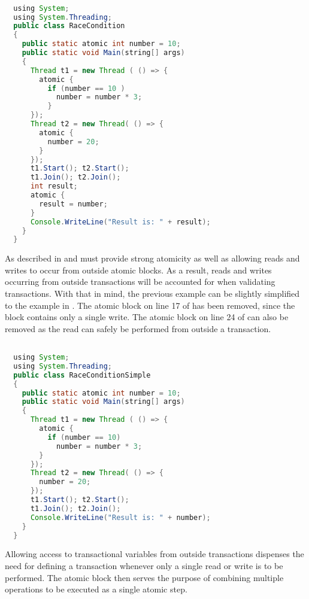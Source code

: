 \begin{lstlisting}[label=lst:stm_atomic_syntax,
 caption={Transaction Syntax},
 language=Java, 
 showspaces=false,
 showtabs=false,
 breaklines=true,
 showstringspaces=false,
 breakatwhitespace=true,
 commentstyle=\color{greencomments},
 keywordstyle=\color{bluekeywords},
 stringstyle=\color{redstrings},
 morekeywords={atomic, retry, orElse, var, get, set, using}]  % Start your code-block

  using System;
  using System.Threading;
  public class RaceCondition
  {
    public static atomic int number = 10;
    public static void Main(string[] args)
    {
      Thread t1 = new Thread ( () => {
        atomic {
          if (number == 10 )          
            number = number * 3;
          }
      });
      Thread t2 = new Thread( () => {
        atomic {
          number = 20;
        }
      });
      t1.Start(); t2.Start();
      t1.Join(); t2.Join();
      int result;
      atomic {
        result = number;         
      }
      Console.WriteLine("Result is: " + result);
    }
  }
\end{lstlisting}

As described in  and  \stmnamesp must provide strong atomicity as well as allowing reads and writes to occur from outside atomic blocks. As a result, reads and writes occurring from outside transactions will be accounted for when validating transactions. With that in mind, the previous example can be slightly simplified to the example in . The atomic block on line 17 of  has been removed, since the  block contains only a single write. The atomic block on line 24 of  can also be removed as the read can safely be performed from outside a transaction.

\begin{lstlisting}[label=lst:stm_atomic_syntax_simplified,
 caption={Transaction Syntax Simplified},
 language=Java, 
 showspaces=false,
 showtabs=false,
 breaklines=true,
 showstringspaces=false,
 breakatwhitespace=true,
 commentstyle=\color{greencomments},
 keywordstyle=\color{bluekeywords},
 stringstyle=\color{redstrings},
 morekeywords={atomic, retry, orElse, var, get, set, using}]  % Start your code-block

  using System;
  using System.Threading;
  public class RaceConditionSimple
  {
    public static atomic int number = 10;
    public static void Main(string[] args)
    {
      Thread t1 = new Thread ( () => {
        atomic {
          if (number == 10)          
            number = number * 3;
        }
      });
      Thread t2 = new Thread( () => {
        number = 20;
      });
      t1.Start(); t2.Start();
      t1.Join(); t2.Join();
      Console.WriteLine("Result is: " + number);
    }
  }
\end{lstlisting}
Allowing access to transactional variables from outside transactions dispenses the need for defining a transaction whenever only a single read or write is to be performed. The atomic block then serves the purpose of combining multiple operations to be executed as a single atomic step.

